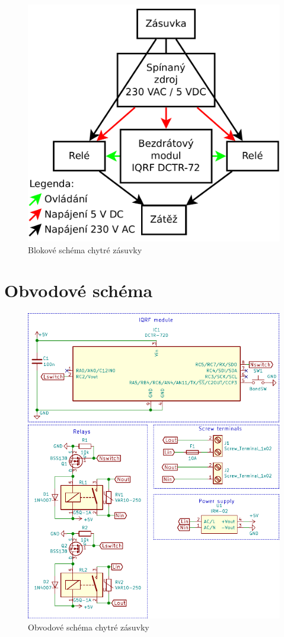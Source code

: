 \documentclass[12pt,a4paper,oneside]{article}
\begin{document}
\begin{figure}[H]
\label{fig:blokove-schema-zasuvky}
\minipage{\textwidth}
\includegraphics[width = 128mm]{img/blokove-schema-zasuvky.pdf}
\caption{Blokové schéma chytré zásuvky}
\endminipage
\end{figure}

\section{Obvodové schéma}

\begin{figure}[H]
\label{fig:schematic}
\minipage{\textwidth}
\includegraphics[width = 128mm]{img/schematic.pdf}
\caption{Obvodové schéma chytré zásuvky}
\endminipage
\end{figure}
\end{document}
